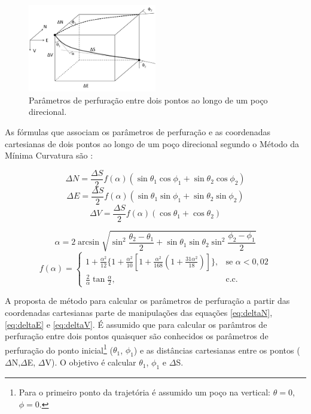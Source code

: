 \documentclass[final,3p,12pt]{elsarticle}
\begin{document}
\begin{figure}[h]
    \centering
    \includegraphics[width=0.5\textwidth]{Parametros}
    \caption{Parâmetros de perfuração entre dois pontos ao longo de um poço direcional.}
    \label{fig:parametros}
\end{figure}


As fórmulas que associam os parâmetros de perfuração e as coordenadas cartesianas de dois pontos ao longo de um poço direcional segundo o Método da Mínima Curvatura são \cite{10.2118/84246-MS}:

\begin{equation} \label{eq:deltaN}
    \Delta N = \frac{\Delta S}{2} f(\alpha) (\sin \theta_1 \cos \phi_1 + \sin \theta_2 \cos \phi_2)
\end{equation}
\begin{equation} \label{eq:deltaE}
    \Delta E = \frac{\Delta S}{2} f(\alpha) (\sin \theta_1 \sin \phi_1 + \sin \theta_2 \sin \phi_2)
\end{equation}
\begin{equation} \label{eq:deltaV}
    \Delta V = \frac{\Delta S}{2} f(\alpha) (\cos \theta_1 + \cos \theta_2)
\end{equation}

\begin{equation} \label{eq:alpha}
    \alpha = 2 \arcsin \sqrt{ \sin^2 \frac{\theta_2-\theta_1}{2} + \sin \theta_1 \sin \theta_2 \sin^2 \frac{\phi_2-\phi_1}{2} }
\end{equation}
\begin{equation} \label{eq:f_alpha}
    f(\alpha)= \begin{cases}
        1+\frac{\alpha^2}{12}\{1+\frac{\alpha^2}{10}[1+\frac{\alpha^2}{168}(1+\frac{31\alpha^2}{18})]\},&\text{se } \alpha<0,02 \\
        \frac{2}{\alpha}\tan{\frac{\alpha}{2}},&\text{c.c. }  
    \end{cases}
\end{equation}

A proposta de método para calcular os parâmetros de perfuração a partir das coordenadas cartesianas parte de manipulações das equações \ref{eq:deltaN}, \ref{eq:deltaE} e \ref{eq:deltaV}. É assumido que para calcular os parâmtros de perfuração entre dois pontos quaisquer são conhecidos os parâmetros de perfuração do ponto inicial\footnote{Para o primeiro ponto da trajetória é assumido um poço na vertical: $\theta=0$, $\phi=0$.} ($\theta_1$, $\phi_1$) e as distâncias cartesianas entre os pontos ($\Delta$N,$\Delta$E, $\Delta$V). O objetivo é calcular $\theta_1$, $\phi_1$ e $\Delta$S.
\end{document}
